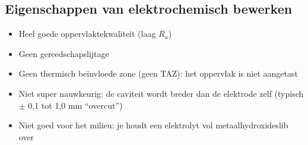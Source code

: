 \documentclass[a4paper,11pt,twoside]{report}
\begin{document}
\subsection{Eigenschappen van elektrochemisch bewerken}
\begin{itemize}
    \item Heel goede oppervlaktekwaliteit (laag $R_a$)
    \item Geen gereedschapslijtage
    \item Geen thermisch beïnvloede zone (geen TAZ): het oppervlak is niet aangetast
    \item Niet super nauwkeurig: de caviteit wordt breder dan de elektrode zelf (typisch $\pm$ 0,1 tot 1,0 mm ``overcut'')
    \item Niet goed voor het milieu: je houdt een elektrolyt vol metaalhydroxideslib over
\end{itemize}
\end{document}
